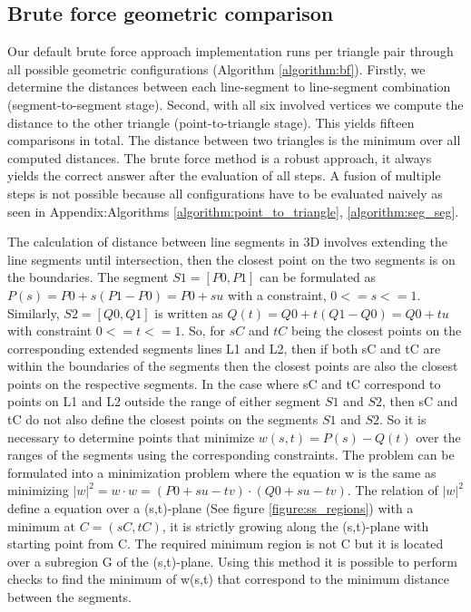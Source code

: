 \subsection{Brute force geometric comparison}

%
%
Our default brute force approach implementation runs per triangle pair through all possible geometric
configurations (Algorithm \ref{algorithm:bf}).
Firstly, we determine the distances between each line-segment to line-segment combination (segment-to-segment stage).
Second, with all six involved vertices we compute the distance to the other triangle (point-to-triangle stage).
This yields fifteen comparisons in total. The distance between two triangles is the minimum over all computed distances.
The brute force method is a robust approach, it always yields the correct answer after the evaluation of all steps. A fusion of multiple steps is not possible because all configurations have to be evaluated naively as seen in Appendix:Algorithms \ref{algorithm:point_to_triangle}, \ref{algorithm:seg_seg}.

The calculation of distance between line segments \cite{Ericson2005} in 3D involves extending the line segments until intersection, then the closest point on the two segments is on the boundaries.
The segment $S1 = [P0, P1]$ can be formulated as $P(s) = P0+s(P1-P0) = P0+su$ with a constraint, $0<=s<=1$. Similarly, $S2 = [Q0, Q1]$
is written as $Q(t) = Q0+t(Q1-Q0) = Q0+tu$ with constraint $0<=t<=1$. So, for $sC$ and $tC$ being the closest points on the corresponding extended segments lines L1 and L2, then if  both sC and tC are within the boundaries of the segments then the closest points are also the closest points on the respective segments. 
In the case where sC and tC correspond to points on L1 and L2 outside the range of either segment $S1$ and $S2$, then sC and tC do not also define the closest points on the segments $S1$ and $S2$. So it is necessary to determine points that minimize 
$w(s,t) = P(s) - Q(t)$ over the ranges of the segments using the corresponding constraints. 
The problem can be formulated into a minimization problem where the equation w is the same as minimizing 
$|w|^2 = w \cdot w= (P0+su-tv) \cdot (Q0+su-tv)$. The relation of $|w|^2$ define a equation over a (s,t)-plane (See figure \ref{figure:ss_regions}) with a minimum at $C = (sC, tC)$, it is strictly growing along the (s,t)-plane with starting point from C. The required minimum region is not C but it is located over a subregion G of the (s,t)-plane. Using this method it is possible to perform checks to find the minimum of w(s,t) that correspond to the minimum distance between the segments.

